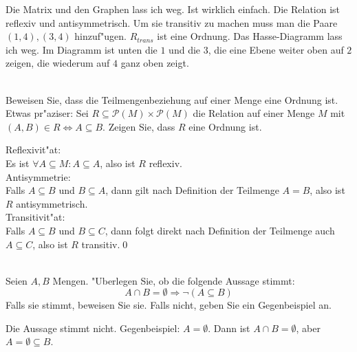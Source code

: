 \begin{loesung}
Die Matrix und den Graphen lass ich weg. Ist wirklich einfach.
Die Relation ist reflexiv und antisymmetrisch.
Um sie transitiv zu machen muss man die Paare $(1,4),(3,4)$ hinzuf"ugen.
$R_{trans}$ ist eine Ordnung. Das Hasse-Diagramm lass ich weg. Im Diagramm ist unten die $1$ und die $3$, die eine Ebene weiter oben auf $2$ zeigen, die wiederum auf $4$ ganz oben zeigt.
\end{loesung}



\\
Beweisen Sie, dass die Teilmengenbeziehung auf einer Menge eine Ordnung ist. Etwas pr"aziser: Sei $R\subseteq \mathscr{P}(M)\times\mathscr{P}(M)$ die Relation auf einer Menge $M$ mit $(A,B)\in R\Leftrightarrow A\subseteq B$. Zeigen Sie, dass $R$ eine Ordnung ist.

\begin{loesung}
Reflexivit"at:\\
Es ist $\forall A\subseteq M:A\subseteq A$, also ist $R$ reflexiv.\\
Antisymmetrie:\\
Falls $A\subseteq B$ und $B\subseteq A$, dann gilt nach Definition der Teilmenge $A=B$, also ist $R$ antisymmetrisch.\\
Transitivit"at:\\
Falls $A\subseteq B$ und $B\subseteq C$, dann folgt direkt nach Definition der Teilmenge auch $A\subseteq C$, also ist $R$ transitiv.\qed
\end{loesung}



\\
Seien $A,B$ Mengen. "Uberlegen Sie, ob die folgende Aussage stimmt: 
\[A\cap B=\emptyset\Rightarrow \neg (A\subseteq B)\]
Falls sie stimmt, beweisen Sie sie. Falls nicht, geben Sie ein Gegenbeispiel an.

\begin{loesung}
Die Aussage stimmt nicht. Gegenbeispiel: $A=\emptyset$. Dann ist $A\cap B=\emptyset$, aber $A=\emptyset\subseteq B$.
\end{loesung}

